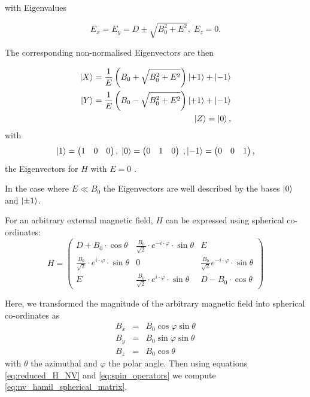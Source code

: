with Eigenvalues 

\begin{equation}
    E_x = E_y = D \pm \sqrt{B_0^2  + E^2}, \; E_z = 0.
    \label{eq:reduced_H_NV_eigenvalues}
\end{equation}

The corresponding non-normalised Eigenvectors are then 

\begin{eqnarray}
    \ket{X} = \frac{1}{E} \left(B_0 + \sqrt{B_0^2 + E^2}\right) \ket{+1} + \ket{-1} \\ 
    \ket{Y} = \frac{1}{E} \left(B_0 - \sqrt{B_0^2 + E^2}\right) \ket{+1} + \ket{-1} \\ 
    \ket{Z} = \ket{0},
\end{eqnarray}
with
\begin{equation}
    \ket{1} = \begin{pmatrix}
        1 & 0 & 0 
    \end{pmatrix}, \; 
    \ket{0} = \begin{pmatrix}
        0 & 1 & 0 
    \end{pmatrix}\;, 
    \ket{-1} = \begin{pmatrix}
        0 & 0 & 1 
    \end{pmatrix},
    \label{eq:base_states}
\end{equation}
the Eigenvectors for $H$ with $E=0$ .

In the case where $E \ll B_0$ the Eigenvectors are well described by the bases $\ket{0}$ and $\ket{\pm 1}$.

For an arbitrary external magnetic field, $H$ can be expressed using spherical co-ordinates: 
\begin{equation}
    H = \begin{pmatrix}
        D + B_0 \cdot \cos \theta & \frac{B_0}{\sqrt{2}} \cdot e^{-i\cdot \varphi} \cdot \sin\theta & E \\ 
        \frac{B_0}{\sqrt{2}} \cdot e^{i \cdot \varphi} \cdot \sin\theta & 0 & \frac{B_0}{\sqrt{2}} e^{-i\cdot \varphi} \cdot \sin\theta \\ 
        E & \frac{B_0}{\sqrt{2}} \cdot e^{i \cdot \varphi} \cdot \sin\theta & D - B_0 \cdot \cos \theta
    \end{pmatrix}
    \label{eq:nv_hamil_spherical_matrix}
\end{equation}


Here, we transformed the magnitude of the arbitrary magnetic field into spherical co-ordinates as 
\begin{eqnarray}
    B_x  &=& B_0 \cos\varphi \sin\theta \\ 
    B_y  &=& B_0 \sin\varphi \sin\theta \\ 
    B_z  &=& B_0 \cos\theta 
\end{eqnarray}
with $\theta$ the azimuthal and $\varphi$ the polar angle. Then using equations \ref{eq:reduced_H_NV} and \ref{eq:spin_operators} we compute \ref{eq:nv_hamil_spherical_matrix}.  

